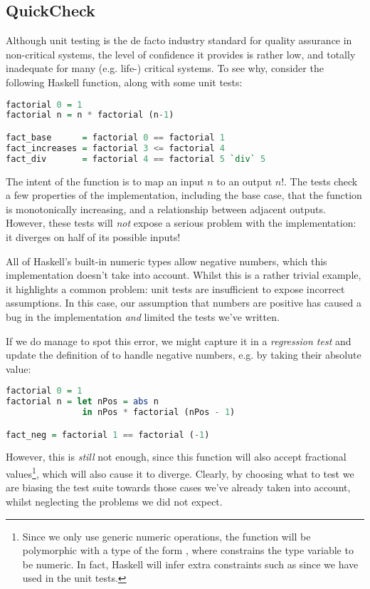 \subsection{QuickCheck}
\label{sec:quickcheck}

Although unit testing is the de facto industry standard for quality assurance in
non-critical systems, the level of confidence it provides is rather low, and
totally inadequate for many (e.g. life-) critical systems. To see why, consider
the following Haskell function, along with some unit tests:

\begin{lstlisting}[language=Haskell, xleftmargin=.2\textwidth, xrightmargin=.2\textwidth]
factorial 0 = 1
factorial n = n * factorial (n-1)

fact_base      = factorial 0 == factorial 1
fact_increases = factorial 3 <= factorial 4
fact_div       = factorial 4 == factorial 5 `div` 5
\end{lstlisting}

The intent of the function is to map an input $n$ to an output $n!$. The tests
check a few properties of the implementation, including the base case, that the
function is monotonically increasing, and a relationship between adjacent
outputs. However, these tests will \emph{not} expose a serious problem with the
implementation: it diverges on half of its possible inputs!

All of Haskell's built-in numeric types allow negative numbers, which this
implementation doesn't take into account. Whilst this is a rather trivial
example, it highlights a common problem: unit tests are insufficient to expose
incorrect assumptions. In this case, our assumption that numbers are positive
has caused a bug in the implementation \emph{and} limited the tests we've
written.

If we do manage to spot this error, we might capture it in a \emph{regression
  test} and update the definition of  to handle negative numbers,
e.g. by taking their absolute value:

\begin{lstlisting}[language=Haskell, xleftmargin=.2\textwidth, xrightmargin=.2\textwidth]
factorial 0 = 1
factorial n = let nPos = abs n
               in nPos * factorial (nPos - 1)

fact_neg = factorial 1 == factorial (-1)
\end{lstlisting}

However, this is \emph{still} not enough, since this function will also accept
fractional values\footnote{Since we only use generic numeric operations, the
  function will be polymorphic with a type of the form , where  constrains the type variable  to be
  numeric. In fact, Haskell will infer extra constraints such as  since
  we have used \hs{==} in the unit tests.}, which will also cause it to
diverge. Clearly, by choosing what to test we are biasing the test suite towards
those cases we've already taken into account, whilst neglecting the problems we
did not expect.

